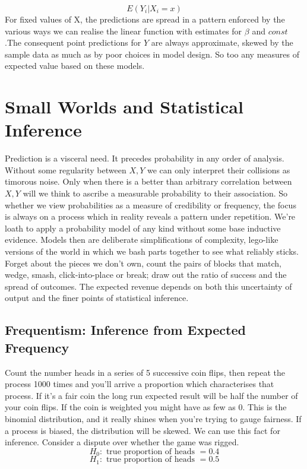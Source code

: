 \documentclass{tufte-handout}
\begin{document}
$$ E(Y_{i} | X_{i} = x )$$
For fixed values of X, the predictions are spread in a pattern enforced by the various ways we can realise the linear function with estimates for $\beta$ and $const$.The consequent point predictions for $Y$ are always approximate, skewed by the sample data as much as by poor choices in model design. So too any measures of expected value based on these models.


\section{\textbf{Small Worlds and Statistical Inference}}
\label{sec:Inference}
Prediction is a visceral need. It precedes probability in any order of analysis. Without some regularity between $X, Y$ we can only interpret their collisions as timorous noise. Only when there is a better than arbitrary correlation between $X, Y$ will we think to ascribe a measurable probability to their association. So whether we view probabilities as a measure of credibility or frequency, the focus is always on a process which in reality reveals a pattern under repetition. We're loath to apply a probability model of any kind without some base inductive evidence.
Models then are deliberate simplifications of complexity, lego-like versions of the world in which we bash parts together to see what reliably sticks. Forget about the pieces we don't own, count the pairs of blocks that match, wedge, smash, click-into-place or break; draw out the ratio of success and the spread of outcomes. The expected revenue depends on both this uncertainty of output and the finer points of statistical inference.

\subsection{Frequentism: Inference from Expected Frequency}
Count the number heads in a series of 5 successive coin flips, then repeat the process 1000 times and you'll arrive a proportion which characterises that process. If it's a fair coin the long run expected result will be half the number of your coin flips. If the coin is weighted you might have as few as 0. This is the binomial distribution, and it really shines when you're trying to gauge fairness. If a process is biased, the distribution will be skewed. We can use this fact for inference. Consider a dispute over whether the game was rigged. 
$$ H_0 : \text{ true proportion of heads } = 0.4  $$
$$ H_1 : \text{ true proportion of heads } =  0.5 $$
\end{document}
